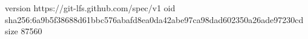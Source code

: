 version https://git-lfs.github.com/spec/v1
oid sha256:6a9b5f38688d61bbc576abafd8ea0da42abe97ca98dad602350a26ade97230cd
size 87560
